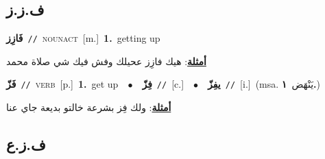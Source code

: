 \documentclass[10pt,a4paper,twoside]{article} %
\begin{document}
\begin{multicols}{2}
\vspace{-3mm}
\subsection*{\color{blue}\foreignlanguage{arabic}{ف.ز.ز}\color{blue}{}} 

{\setlength\topsep{0pt}\textbf{\foreignlanguage{arabic}{فَازِز}}\ {\color{gray}\texttt{//}\color{black}}\ \textsc{noun\textunderscore act}\ [m.]\ \textbf{1.}~getting up\  \begin{flushright}\color{gray}\foreignlanguage{arabic}{\textbf{\underline{\foreignlanguage{arabic}{أمثلة}}}: هيك فازِز عحيلك وفش فيك شي صلاة محمد}\end{flushright}\color{black}} \vspace{2mm}

{\setlength\topsep{0pt}\textbf{\foreignlanguage{arabic}{فَزّ}}\ {\color{gray}\texttt{//}\color{black}}\ \textsc{verb}\ [p.]\ \textbf{1.}~get up\ \ $\bullet$\ \ \setlength\topsep{0pt}\textbf{\foreignlanguage{arabic}{فِزّ}}\ {\color{gray}\texttt{//}\color{black}}\ [c.]\ \ $\bullet$\ \ \setlength\topsep{0pt}\textbf{\foreignlanguage{arabic}{يفِزّ}}\ {\color{gray}\texttt{//}\color{black}}\ [i.]\ \color{gray}(msa. \foreignlanguage{arabic}{يَنْهَض}~\foreignlanguage{arabic}{\textbf{١.}})\color{black}\  \begin{flushright}\color{gray}\foreignlanguage{arabic}{\textbf{\underline{\foreignlanguage{arabic}{أمثلة}}}: ولك فِز بشرعة خالتو بديعة جاي عنا}\end{flushright}\color{black}} \vspace{2mm}

\vspace{-3mm}
\subsection*{\color{blue}\foreignlanguage{arabic}{ف.ز.ع}\color{blue}{}} 


\end{multicols}
\end{document}
